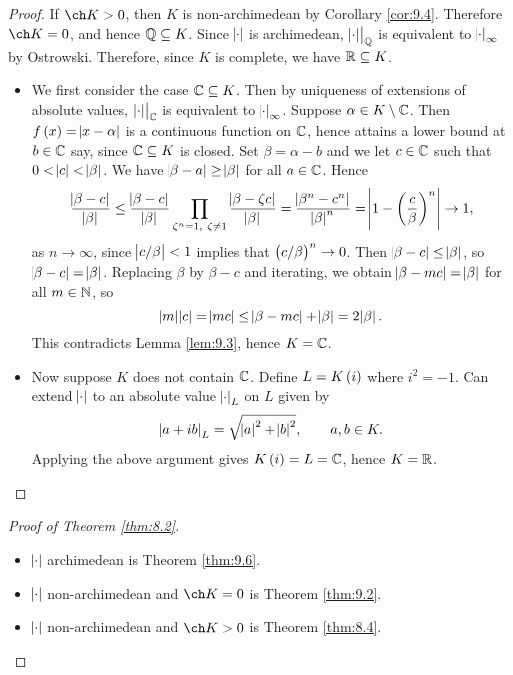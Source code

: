 \begin{proof}
If $ \ch K > 0 $, then $ K $ is non-archimedean by Corollary \ref{cor:9.4}. Therefore $ \ch K = 0 $, and hence $ \mathbb{Q} \subseteq K $. Since $ \abs{\cdot} $ is archimedean, $ \left. \abs{\cdot} \right|_{\mathbb{Q}} $ is equivalent to $ \abs{\cdot}_\infty $ by Ostrowski. Therefore, since $ K $ is complete, we have $ \mathbb{R} \subseteq K $.
\begin{itemize}
\item We first consider the case $ \mathbb{C} \subseteq K $. Then by uniqueness of extensions of absolute values, $ \left. \abs{\cdot} \right|_{\mathbb{C}} $ is equivalent to $ \abs{\cdot}_\infty $. Suppose $ \alpha \in K \setminus \mathbb{C} $. Then $ f\br{x} = \abs{x - \alpha} $ is a continuous function on $ \mathbb{C} $, hence attains a lower bound at $ b \in \mathbb{C} $ say, since $ \mathbb{C} \subseteq K $ is closed. Set $ \beta = \alpha - b $ and we let $ c \in \mathbb{C} $ such that $ 0 < \abs{c} < \abs{\beta} $. We have $ \abs{\beta - a} \ge \abs{\beta} $ for all $ a \in \mathbb{C} $. Hence
$$ \dfrac{\abs{\beta - c}}{\abs{\beta}} \le \dfrac{\abs{\beta - c}}{\abs{\beta}}\prod_{\zeta^n = 1, \ \zeta \ne 1} \dfrac{\abs{\beta - \zeta c}}{\abs{\beta}} = \dfrac{\abs{\beta^n - c^n}}{\abs{\beta}^n} = \abs{1 - \br{\dfrac{c}{\beta}}^n} \to 1, $$
as $ n \to \infty $, since $ \abs{c / \beta} < 1 $ implies that $ \br{c / \beta}^n \to 0 $. Then $ \abs{\beta - c} \le \abs{\beta} $, so $ \abs{\beta - c} = \abs{\beta} $. Replacing $ \beta $ by $ \beta - c $ and iterating, we obtain $ \abs{\beta - mc} = \abs{\beta} $ for all $ m \in \mathbb{N} $, so
$$ \abs{m}\abs{c} = \abs{mc} \le \abs{\beta - mc} + \abs{\beta} = 2\abs{\beta}. $$
This contradicts Lemma \ref{lem:9.3}, hence $ K = \mathbb{C} $.
\item Now suppose $ K $ does not contain $ \mathbb{C} $. Define $ L = K\br{i} $ where $ i^2 = -1 $. Can extend $ \abs{\cdot} $ to an absolute value $ \abs{\cdot}_L $ on $ L $ given by
$$ \abs{a + ib}_L = \sqrt{\abs{a}^2 + \abs{b}^2}, \qquad a, b \in K. $$
Applying the above argument gives $ K\br{i} = L = \CC $, hence $ K = \mathbb{R} $.
\end{itemize}
\end{proof}

\begin{proof}[Proof of Theorem \ref{thm:8.2}]
\hfill
\begin{itemize}
\item $ \abs{\cdot} $ archimedean is Theorem \ref{thm:9.6}.
\item $ \abs{\cdot} $ non-archimedean and $ \ch K = 0 $ is Theorem \ref{thm:9.2}.
\item $ \abs{\cdot} $ non-archimedean and $ \ch K > 0 $ is Theorem \ref{thm:8.4}.
\end{itemize}
\end{proof}

